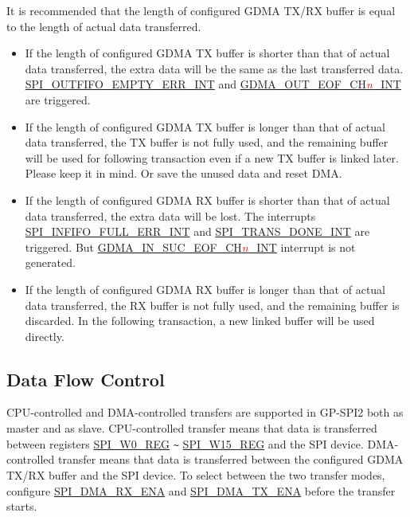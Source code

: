 \documentclass[main\_\_EN.tex]{subfiles}
\begin{document}
It is recommended that the length of configured GDMA TX/RX buffer is equal to the length of actual data transferred. 

\begin{itemize}
    \item If the length of configured GDMA TX buffer is shorter than that of actual data transferred, the extra data will be the same as the last transferred data. \hyperref[int:SPIOUTFIFOEMPTYERRINT]{SPI\_OUTFIFO\_EMPTY\_ERR\_INT} and \hyperref[int:GDMAOUTEOFINT]{GDMA\_OUT\_EOF\_CH\textcolor{red}{\it{n}}\_INT} are triggered.
    
    \item If the length of configured GDMA TX buffer is longer than that of actual data transferred, the TX buffer is not fully used, and the remaining buffer will be used for following transaction even if a new TX buffer is linked later. Please keep it in mind. Or save the unused data and reset DMA.
    
    \item If the length of configured GDMA RX buffer is shorter than that of actual data transferred, the extra data will be lost. The interrupts \hyperref[int:SPIINFIFOFULLERRINT]{SPI\_INFIFO\_FULL\_ERR\_INT} and \hyperref[int:SPITRANSDONEINT]{SPI\_TRANS\_DONE\_INT} are triggered. But \hyperref[int:GDMAINSUCEOFINT]{GDMA\_IN\_SUC\_EOF\_CH\textcolor{red}{\it{n}}\_INT} interrupt is not generated.
    
    \item If the length of configured GDMA RX buffer is longer than that of actual data transferred, the RX buffer is not fully used, and the remaining buffer is discarded. In the following transaction, a new linked buffer will be used directly.
    
\end{itemize}

\subsection{Data Flow Control}\label{Subsection:Data Flow Control in GP-SPI2 as Master and Slave}

CPU-controlled and DMA-controlled transfers are supported in GP-SPI2 both as master and as slave.
CPU-controlled transfer means that data is transferred between registers \hyperref[regdesc:SPIW0REG]{SPI\_W0\_REG} \verb+~+ \hyperref[regdesc:SPIW0REG]{SPI\_W15\_REG} and the SPI device. DMA-controlled transfer means that data is transferred between the configured GDMA TX/RX buffer and the SPI device. To select between the two transfer modes, configure \hyperref[fielddesc:SPIDMARXENA]{SPI\_DMA\_RX\_ENA} and \hyperref[fielddesc:SPIDMATXENA]{SPI\_DMA\_TX\_ENA} before the transfer starts.
\end{document}
